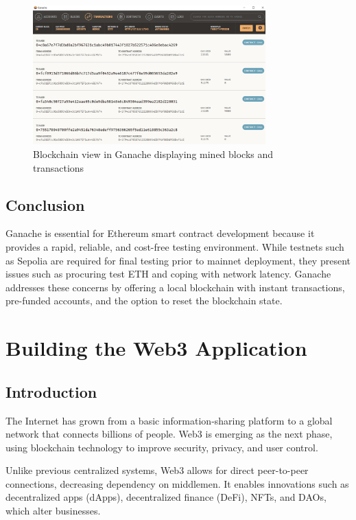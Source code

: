 \documentclass[a4paper,12pt]{report}
\begin{document}
\begin{figure}[H]
\centering
\includegraphics[width=0.8\textwidth]{trasnsactions.PNG}
\caption{Blockchain view in Ganache displaying mined blocks and transactions}
\label{fig:ganache_blocks}
\end{figure}


\section{Conclusion}
Ganache is essential for Ethereum smart contract development because it provides a rapid, reliable, and cost-free testing environment.  While testnets such as Sepolia are required for final testing prior to mainnet deployment, they present issues such as procuring test ETH and coping with network latency.  Ganache addresses these concerns by offering a local blockchain with instant transactions, pre-funded accounts, and the option to reset the blockchain state.


\chapter{Building the Web3 Application}
\section{Introduction}
The Internet has grown from a basic information-sharing platform to a global network that connects billions of people\cite{aria2023influential}\cite{nabben2023web3}\cite{murray2023promise}.  Web3 is emerging as the next phase, using blockchain technology to improve security, privacy, and user control\cite{tennakoon2023smart}\cite{sadowski2023expansive}.

 Unlike previous centralized systems, Web3 allows for direct peer-to-peer connections, decreasing dependency on middlemen.  It enables innovations such as decentralized apps (dApps), decentralized finance (DeFi), NFTs, and DAOs, which alter businesses\cite{cong2023inclusion}.
\end{document}
